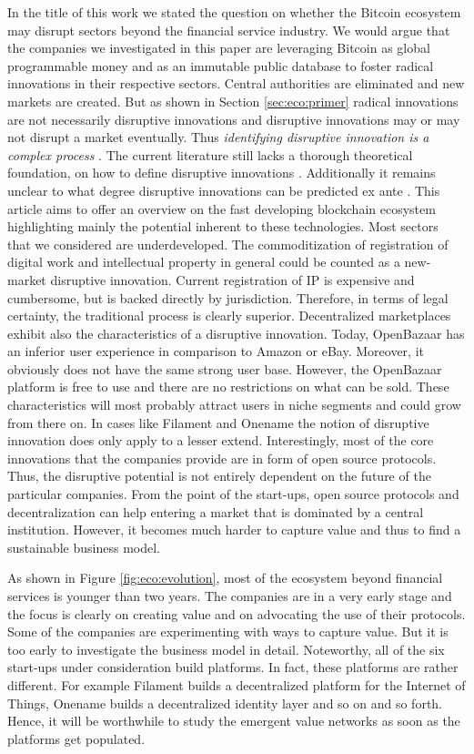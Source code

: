In the title of this work we stated the question on whether the Bitcoin ecosystem 
may disrupt sectors beyond the financial service industry. We would argue that 
the companies we investigated in this paper are leveraging Bitcoin as global programmable 
money and as an immutable public database to foster radical innovations in their 
respective sectors. Central authorities are eliminated and new markets are created. 
But as shown in Section \ref{sec:eco:primer} radical innovations are not necessarily disruptive 
innovations and disruptive innovations may or may not disrupt a market eventually. 
Thus \emph{identifying disruptive innovation is a complex process} \parencite{Kaltenecker2015234}. The current literature still lacks a thorough theoretical foundation, 
on how to define disruptive innovations \parencite{ISI:000283729100005}. Additionally it remains 
unclear to what degree disruptive innovations can be predicted ex ante \parencite{JPIM:JPIM179}. This article aims to offer an overview on the fast developing 
blockchain ecosystem highlighting mainly the potential inherent to these technologies. 
Most sectors that we considered are underdeveloped. The commoditization of registration 
of digital work and intellectual property in general could be counted as a new-market 
disruptive innovation. Current registration of IP is expensive and cumbersome, 
but is backed directly by jurisdiction. Therefore, in terms of legal certainty, 
the traditional process is clearly superior. Decentralized marketplaces exhibit 
also the characteristics of a disruptive innovation. Today, OpenBazaar has an inferior 
user experience in comparison to Amazon or eBay. Moreover, it obviously does not 
have the same strong user base. However, the OpenBazaar platform is free to use 
and there are no restrictions on what can be sold. These characteristics will most 
probably attract users in niche segments and could grow from there on. In cases 
like Filament and Onename the notion of disruptive innovation does only apply to 
a lesser extend. Interestingly, most of the core innovations that the companies 
provide are in form of open source protocols. Thus, the disruptive potential is 
not entirely dependent on the future of the particular companies. From the point 
of the start-ups, open source protocols and decentralization can help entering 
a market that is dominated by a central institution. However, it becomes much harder 
to capture value and thus to find a sustainable business model.

As shown in Figure \ref{fig:eco:evolution}, most of the ecosystem beyond financial services is younger 
than two years. The companies are in a very early stage and the focus is clearly 
on creating value and on advocating the use of their protocols. Some of the companies 
are experimenting with ways to capture value. But it is too early to investigate 
the business model in detail. Noteworthy, all of the six start-ups under consideration 
build platforms. In fact, these platforms are rather different. For example Filament 
builds a decentralized platform for the Internet of Things, Onename builds a decentralized 
identity layer and so on and so forth. Hence, it will be worthwhile to study the 
emergent value networks as soon as the platforms get populated.

